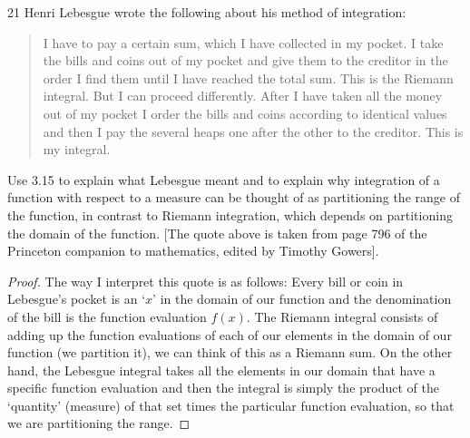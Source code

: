 \begin{exercise}{21}
Henri Lebesgue wrote the following about his method of integration:
\begin{quotation}
I have to pay a certain sum, which I have collected in my pocket.
I take the bills and coins out of my pocket and give them to the creditor in the order I find them  until I have reached the total sum.
This is the Riemann integral.
But I can proceed differently.
After I have taken all the money out of my pocket I order the bills and coins according to identical values and then I pay the several heaps one after the other to the creditor.
This is my integral.
\end{quotation}
Use 3.15 to explain what Lebesgue meant and to explain why integration of a function with respect to a measure can be thought of as partitioning the range of the function, in contrast to Riemann integration, which depends on partitioning the domain of the function.
[The quote above is taken from page 796 of the Princeton companion to mathematics, edited by Timothy Gowers].
\end{exercise}
\begin{proof}
The way I interpret this quote is as follows:
Every bill or coin in Lebesgue's pocket is an `$x$' in the domain of our function and the denomination of the bill is the function evaluation $f(x)$.
The Riemann integral consists of adding up the function evaluations of each of our elements in the domain of our function (we partition it), we can think of this as a Riemann sum.
On the other hand, the Lebesgue integral takes all the elements in our domain that have a specific function evaluation and then the integral is simply the product of the `quantity' (measure) of that set times the particular function evaluation, so that we are partitioning the range.
\end{proof} 
